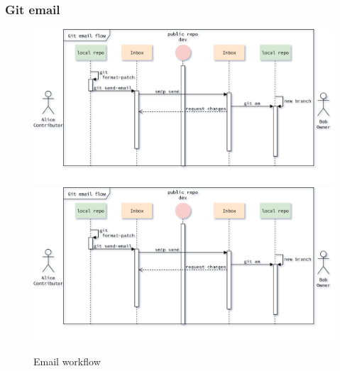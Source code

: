 \begin{frame}[noframenumbering]
    \frametitle{Git email}
    \addtocounter{page}{-1}
    \begin{figure}
        \begin{center}
            {
                \includegraphics[height=0.7\textheight,keepaspectratio]{./images/EmailWorkflow_RequestChanges.png}
            }
            {
                \includegraphics[height=0.75\textheight,keepaspectratio]{./images/EmailWorkflow_RequestChanges.png}
            }
            \caption{Email workflow}
        \end{center}
    \end{figure}
\end{frame}

